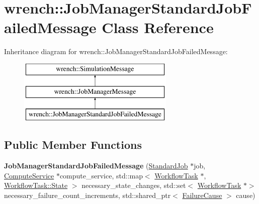 \hypertarget{classwrench_1_1_job_manager_standard_job_failed_message}{}\section{wrench\+:\+:Job\+Manager\+Standard\+Job\+Failed\+Message Class Reference}
\label{classwrench_1_1_job_manager_standard_job_failed_message}
Inheritance diagram for wrench\+:\+:Job\+Manager\+Standard\+Job\+Failed\+Message\+:\begin{figure}[H]
\begin{center}
\leavevmode
\includegraphics[height=3.000000cm]{classwrench_1_1_job_manager_standard_job_failed_message}
\end{center}
\end{figure}
\subsection*{Public Member Functions}
\begin{DoxyCompactItemize}
\item 
\mbox{\label{classwrench_1_1_job_manager_standard_job_failed_message_aad95b6d17890aebcda0f7bc7d25ae509}} 
{\bfseries Job\+Manager\+Standard\+Job\+Failed\+Message} (\hyperlink{classwrench_1_1_standard_job}{Standard\+Job} $\ast$job, \hyperlink{classwrench_1_1_compute_service}{Compute\+Service} $\ast$compute\+\_\+service, std\+::map$<$ \hyperlink{classwrench_1_1_workflow_task}{Workflow\+Task} $\ast$, \hyperlink{classwrench_1_1_workflow_task_a1184f3d7aea21e1c87a9b17e84f1f92a}{Workflow\+Task\+::\+State} $>$ necessary\+\_\+state\+\_\+changes, std\+::set$<$ \hyperlink{classwrench_1_1_workflow_task}{Workflow\+Task} $\ast$$>$ necessary\+\_\+failure\+\_\+count\+\_\+increments, std\+::shared\+\_\+ptr$<$ \hyperlink{classwrench_1_1_failure_cause}{Failure\+Cause} $>$ cause)
\end{DoxyCompactItemize}
